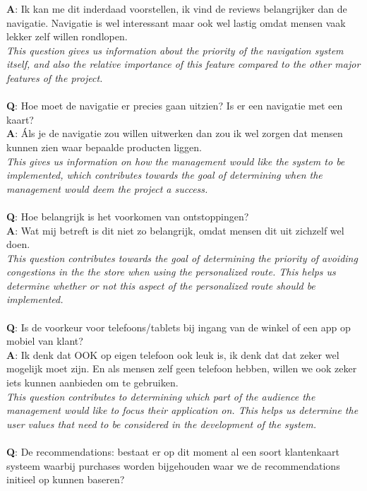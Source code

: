 \documentclass[a4paper]{article}
\begin{document}
\textbf{A}: Ik kan me dit inderdaad voorstellen, ik vind de reviews belangrijker dan de navigatie. Navigatie is wel interessant maar ook wel lastig omdat mensen vaak lekker zelf willen rondlopen. \\
\textit{This question gives us information about the priority of the navigation system itself, and also the relative importance of this feature compared to the other major features of the project.}\\
\\
\textbf{Q}: Hoe moet de navigatie er precies gaan uitzien? Is er een navigatie met een kaart?\\
\textbf{A}: Áls je de navigatie zou willen uitwerken dan zou ik wel zorgen dat mensen kunnen zien waar bepaalde producten liggen.\\
\textit{This gives us information on how the management would like the system to be implemented, which contributes towards the goal of determining when the management would deem the project a success.\\}
\\
\textbf{Q}: Hoe belangrijk is het voorkomen van ontstoppingen?\\
\textbf{A}: Wat mij betreft is dit niet zo belangrijk, omdat mensen dit uit zichzelf wel doen.\\
\textit{This question contributes towards the goal of determining the priority of avoiding congestions in the the store when using the personalized route. This helps us determine whether or not this aspect of the personalized route should be implemented.}\\
\\
\textbf{Q}: Is de voorkeur voor telefoons/tablets bij ingang van de winkel of een app op mobiel van klant?\\
\textbf{A}: Ik denk dat OOK op eigen telefoon ook leuk is, ik denk dat dat zeker wel mogelijk moet zijn. En als mensen zelf geen telefoon hebben, willen we ook zeker iets kunnen aanbieden om te gebruiken.\\
\textit{This question contributes to determining which part of the audience the management would like to focus their application on. This helps us determine the user values that need to be considered in the development of the system.}\\
\\
\textbf{Q}: De recommendations: bestaat er op dit moment al een soort klantenkaart systeem waarbij purchases worden bijgehouden waar we de recommendations initieel op kunnen baseren?\\
\end{document}
